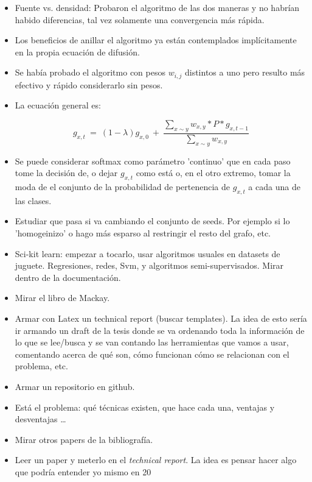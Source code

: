 \documentclass[12pt,a4paper,twocolumn]{report}
\begin{document}
\begin{itemize}
  \item Fuente vs. densidad: Probaron el algoritmo de las dos maneras y no habr\'ian habido diferencias, tal vez solamente una convergencia m\'as r\'apida.
  \item Los beneficios de anillar el algoritmo ya est\'an contemplados impl\'icitamente en la propia ecuaci\'on de difusi\'on.
  \item Se hab\'ia probado el algoritmo con pesos $w_{i,j}$ distintos a uno pero resulto m\'as efectivo y r\'apido considerarlo sin pesos.
  \item La ecuaci\'on general es:
  
  $$g_{x,t} \ = \ (1-\lambda)g_{x,0} \ + \ \frac{\sum_{x\sim y} w_{x,y}*P*g_{x,t-1}}{\sum_{x\sim y} w_{x,y}} $$

  \item Se puede considerar softmax como par\'ametro 'continuo' que en cada paso tome la decisi\'on de, o dejar $g_{x,t} $ como est\'a o, en el otro extremo, tomar la moda de el conjunto de la probabilidad de pertenencia de $g_{x,t}$ a cada una de las clases.
  \item Estudiar que pasa si va cambiando el conjunto de seeds. Por ejemplo si lo 'homogeinizo' o hago m\'as esparso al restringir el resto del grafo, etc.
  \item Sci-kit learn: empezar a tocarlo, usar algoritmos usuales en datasets de juguete. Regresiones, redes, Svm, y algoritmos semi-supervisados. Mirar dentro de la documentaci\'on. 
  \item Mirar el libro de Mackay.
  \item Armar con Latex un technical report (buscar templates). La idea de esto ser\'ia ir armando un draft de la tesis donde se va ordenando toda la informaci\'on de lo que se lee/busca y se van contando las herramientas que vamos a usar, comentando acerca de qu\'e son, c\'omo funcionan c\'omo se relacionan con el problema, etc.
  \item Armar un repositorio en github.
  \item Est\'a el problema: qu\'e t\'ecnicas existen, que hace cada una, ventajas y desventajas \ldots
  \item Mirar otros papers de la bibliograf\'ia.
  \item Leer un paper y meterlo en el \textit{technical report}. La idea es pensar hacer algo que podr\'ia entender yo mismo en 20 

\end{itemize}
\end{document}
